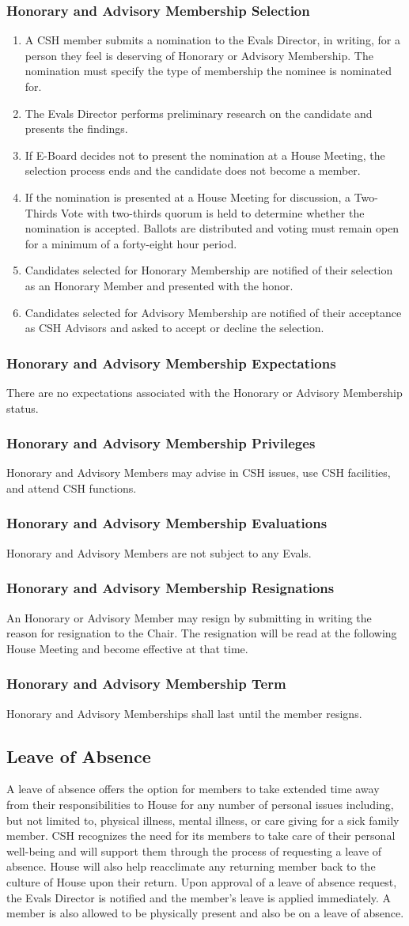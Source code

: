 \documentclass{article}
\newcommand{\asection}[1]{\subsection{#1} \label{#1}}
\newcommand{\asubsection}[1]{\subsubsection{#1} \label{#1}}
\begin{document}
\asubsection{Honorary and Advisory Membership Selection}
\begin{enumerate}
	\item A CSH member submits a nomination to the Evals Director, in writing, for a person they feel is deserving of Honorary or Advisory Membership. The nomination must specify the type of membership the nominee is nominated for.
	\item The Evals Director performs preliminary research on the candidate and presents the findings.
	\item If E-Board decides not to present the nomination at a House Meeting, the selection process ends and the candidate does not become a member.
	\item If the nomination is presented at a House Meeting for discussion, a Two-Thirds Vote with two-thirds quorum is held to determine whether the nomination is accepted.
	      Ballots are distributed and voting must remain open for a minimum of a forty-eight hour period.
	\item Candidates selected for Honorary Membership are notified of their selection as an Honorary Member and presented with the honor.
	\item Candidates selected for Advisory Membership are notified of their acceptance as CSH Advisors and asked to accept or decline the selection.
\end{enumerate}

\asubsection{Honorary and Advisory Membership Expectations}
There are no expectations associated with the Honorary or Advisory Membership status.

\asubsection{Honorary and Advisory Membership Privileges}
Honorary and Advisory Members may advise in CSH issues, use CSH facilities, and attend CSH functions.

\asubsection{Honorary and Advisory Membership Evaluations}
Honorary and Advisory Members are not subject to any Evals.

\asubsection{Honorary and Advisory Membership Resignations}
An Honorary or Advisory Member may resign by submitting in writing the reason for resignation to the Chair.
The resignation will be read at the following House Meeting and become effective at that time.

\asubsection{Honorary and Advisory Membership Term}
Honorary and Advisory Memberships shall last until the member resigns.

\asection{Leave of Absence}
A leave of absence offers the option for members to take extended time away from their responsibilities to House for any number of personal issues including, but not limited to, physical illness, mental illness, or care giving for a sick family member.
CSH recognizes the need for its members to take care of their personal well-being and will support them through the process of requesting a leave of absence.
House will also help reacclimate any returning member back to the culture of House upon their return.
Upon approval of a leave of absence request, the Evals Director is notified and the member's leave is applied immediately.
A member is also allowed to be physically present and also be on a leave of absence.
\end{document}
